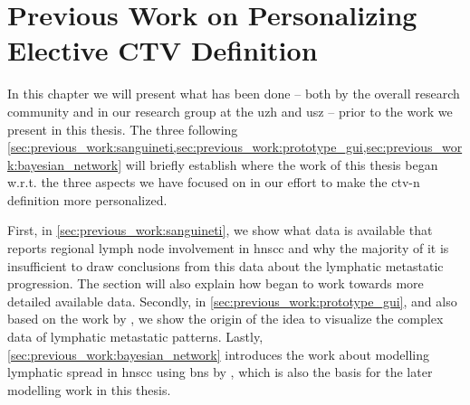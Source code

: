 \documentclass[\relativeRoot/main.tex]{subfiles}
\begin{document}
\chapter[Previous Work on Personalizing CTV-N Definition]{Previous Work on Personalizing Elective CTV Definition}
\label{chap:previous_work}

In this chapter we will present what has been done -- both by the overall research community and in our research group at the \gls{uzh} and \gls{usz} -- prior to the work we present in this thesis. The three following \cref{sec:previous_work:sanguineti,sec:previous_work:prototype_gui,sec:previous_work:bayesian_network} will briefly establish where the work of this thesis began w.r.t. the three aspects we have focused on in our effort to make the \gls{ctv-n} definition more personalized.

First, in \cref{sec:previous_work:sanguineti}, we show what data is available that reports regional lymph node involvement in \gls{hnscc} and why the majority of it is insufficient to draw conclusions from this data about the lymphatic metastatic progression. The section will also explain how  began to work towards more detailed available data. Secondly, in \cref{sec:previous_work:prototype_gui}, and also based on the work by , we show the origin of the idea to visualize the complex data of lymphatic metastatic patterns. Lastly, \cref{sec:previous_work:bayesian_network} introduces the work about modelling lymphatic spread in \gls{hnscc} using \glspl{bn} by , which is also the basis for the later modelling work in this thesis.




\end{document}
